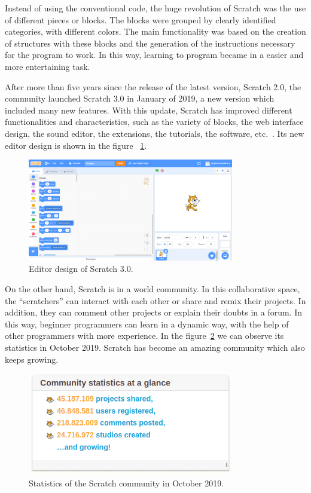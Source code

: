 Instead of using the conventional code, the huge revolution of Scratch was the use of different pieces or blocks. The blocks were grouped by clearly identified categories, with different colors. The main functionality was based on the creation of structures with these blocks and the generation of the instructions necessary for the program to work. In this way, learning to program became in a easier and more entertaining task.

After more than five years since the release of the latest version, Scratch 2.0, the community launched Scratch 3.0 in January of 2019, a new version which included many new features. With this update, Scratch has improved different functionalities and characteristics, such as the variety of blocks, the web interface design, the sound editor, the extensions, the tutorials, the software, etc.~\cite{nin:_scratch3.0}. Its new editor design is shown in the figure ~\ref{fig:scratch}.


\begin{figure}
  \centering
  \includegraphics[width=9cm, keepaspectratio]{img/scratch.png}
  \caption{Editor design of Scratch 3.0.}
  \label{fig:scratch}
\end{figure}

On the other hand, Scratch is in a world community. In this collaborative space, the ``scratchers'' can interact with each other or share and remix their projects. In addition, they can comment other projects or explain their doubts in a forum. In this way, beginner programmers can learn in a dynamic way, with the help of other programmers with more experience. In the figure~\ref{fig:statistics_scratch} we can observe its statistics in October 2019. Scratch has become an amazing community which also keeps growing. 

\begin{figure}
  \centering
  \includegraphics[width=9cm, keepaspectratio]{img/statistics_scratch.png}
  \caption{Statistics of the Scratch community in October 2019.}
  \label{fig:statistics_scratch}
\end{figure}



